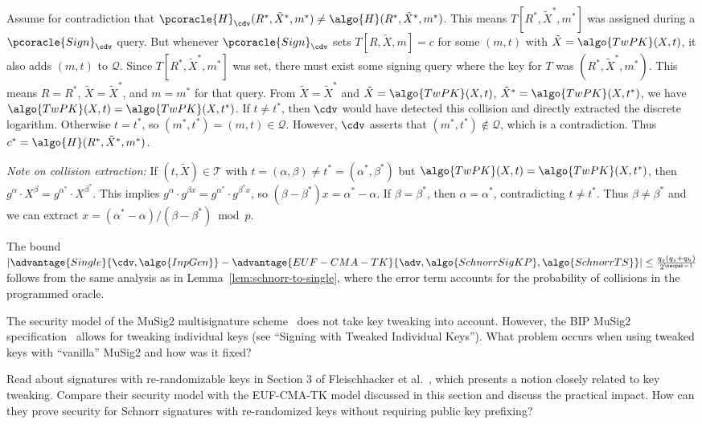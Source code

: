 \begin{mysolution}
  Assume for contradiction that $\pcoracle{H}_{\cdv}(R^*, \tilde{X}^*, m^*) \neq \algo{H}(R^*, \tilde{X}^*, m^*)$.
  This means $T[R^*, \tilde{X}^*, m^*]$ was assigned during a $\pcoracle{Sign}_{\cdv}$ query.
  But whenever $\pcoracle{Sign}_{\cdv}$ sets $T[R, \tilde{X}, m] = c$ for some $(m, t)$ with $\tilde{X} = \algo{TwPK}(X, t)$, it also adds $(m, t)$ to $\mathcal{Q}$.
  Since $T[R^*, \tilde{X}^*, m^*]$ was set, there must exist some signing query where the key for $T$ was $(R^*, \tilde{X}^*, m^*)$.
  This means $R = R^*$, $\tilde{X} = \tilde{X}^*$, and $m = m^*$ for that query.
  From $\tilde{X} = \tilde{X}^*$ and $\tilde{X} = \algo{TwPK}(X, t)$, $\tilde{X}^* = \algo{TwPK}(X, t^*)$, we have $\algo{TwPK}(X, t) = \algo{TwPK}(X, t^*)$.
  If $t \neq t^*$, then $\cdv$ would have detected this collision and directly extracted the discrete logarithm.
  Otherwise $t = t^*$, so $(m^*, t^*) = (m, t) \in \mathcal{Q}$.
  However, $\cdv$ asserts that $(m^*, t^*) \notin \mathcal{Q}$, which is a contradiction.
  Thus $c^* = \algo{H}(R^*, \tilde{X}^*, m^*)$.
  
  \emph{Note on collision extraction:} If $(t, \tilde{X}) \in \mathcal{T}$ with $t = (\alpha, \beta) \neq t^* = (\alpha^*, \beta^*)$ but $\algo{TwPK}(X, t) = \algo{TwPK}(X, t^*)$, then $g^\alpha \cdot X^\beta = g^{\alpha^*} \cdot X^{\beta^*}$.
  This implies $g^\alpha \cdot g^{\beta x} = g^{\alpha^*} \cdot g^{\beta^* x}$, so $(\beta - \beta^*)x = \alpha^* - \alpha$.
  If $\beta = \beta^*$, then $\alpha = \alpha^*$, contradicting $t \neq t^*$.
  Thus $\beta \neq \beta^*$ and we can extract $x = (\alpha^* - \alpha)/(\beta - \beta^*) \bmod p$.
  
  The bound $|\advantage{Single}{\cdv, \algo{InpGen}} - \advantage{EUF-CMA-TK}{\adv, \algo{SchnorrSigKP}, \algo{SchnorrTS}}| \leq \frac{q_s(q_s + q_h)}{2^{\secpar-1}}$ follows from the same analysis as in Lemma~\ref{lem:schnorr-to-single}, where the error term accounts for the probability of collisions in the programmed oracle.
\end{mysolution}
\fi

\begin{exercise}[Optional]
  The security model of the MuSig2 multisignature scheme~\cite{C:NicRufSeu21} does not take key tweaking into account.
  However, the BIP MuSig2 specification~\cite{add:bip-musig2} allows for tweaking individual keys (see ``Signing with Tweaked Individual Keys'').
  What problem occurs when using tweaked keys with ``vanilla'' MuSig2 and how was it fixed?
\end{exercise}

\begin{exercise}[Optional]
  Read about signatures with re-randomizable keys in Section 3 of Fleischhacker et al.~\cite{PKC:FKMSSS16}, which presents a notion closely related to key tweaking.
  Compare their security model with the EUF-CMA-TK model discussed in this section and discuss the practical impact.
  How can they prove security for Schnorr signatures with re-randomized keys without requiring public key prefixing?
\end{exercise}
